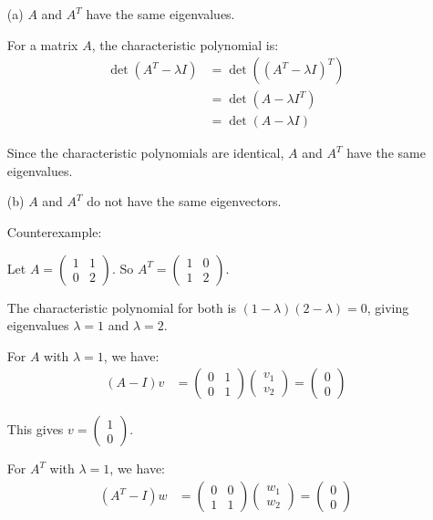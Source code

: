 \documentclass{article}
\begin{document}
\begin{itemize}
    \item[(a)] $A$ and $A^T$ have the same eigenvalues.

    For a matrix $A$, the characteristic polynomial is:
\begin{align*}
\det(A^T - \lambda I) &= \det((A^T - \lambda I)^T) \\
&= \det(A - \lambda I^T) \\
&= \det(A - \lambda I)
\end{align*}

Since the characteristic polynomials are identical, $A$ and $A^T$ have the same eigenvalues.

    \item[(b)] $A$ and $A^T$ do not have the same eigenvectors.

    Counterexample:

Let $A = \begin{pmatrix} 1 & 1 \\ 0 & 2 \end{pmatrix}$. So $A^T = \begin{pmatrix} 1 & 0 \\ 1 & 2 \end{pmatrix}$.

The characteristic polynomial for both is $(1-\lambda)(2-\lambda) = 0$, giving eigenvalues $\lambda = 1$ and $\lambda = 2$.

For $A$ with $\lambda = 1$, we have:
\begin{align*}
(A-I)v &= \begin{pmatrix} 0 & 1 \\ 0 & 1 \end{pmatrix}\begin{pmatrix} v_1 \\ v_2 \end{pmatrix} = \begin{pmatrix} 0 \\ 0 \end{pmatrix}
\end{align*}

This gives $v = \begin{pmatrix} 1 \\ 0 \end{pmatrix}$.

For $A^T$ with $\lambda = 1$, we have:
\begin{align*}
(A^T-I)w &= \begin{pmatrix} 0 & 0 \\ 1 & 1 \end{pmatrix}\begin{pmatrix} w_1 \\ w_2 \end{pmatrix} = \begin{pmatrix} 0 \\ 0 \end{pmatrix}
\end{align*}


\end{itemize}
\end{document}
